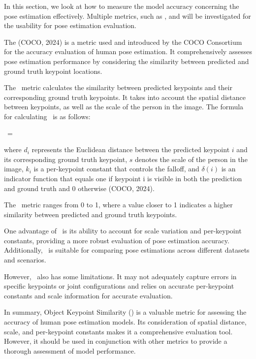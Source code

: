 In this section, we look at how to measure the model accuracy concerning the pose estimation effectively. Multiple metrics, such as {\bf \OKS}, {\bf \APE} and {\bf \MSE} will be investigated for the usability for pose estimation evaluation.

The {\bf \OKS} (\scc COCO, 2024) is a metric used and introduced by the COCO Consortium for the accuracy evaluation of human pose estimation. It comprehensively assesses pose estimation performance by considering the similarity between predicted and ground truth keypoint locations.

The \OKS\ metric calculates the similarity between predicted keypoints and their corresponding ground truth keypoints. It takes into account the spatial distance between keypoints, as well as the scale of the person in the image. The formula for calculating \OKS\ is as follows:

\startplaceformula[reference=oks]
 \startformula \OKS\ = 
 \stopformula
\stopplaceformula

where $ d_i $ represents the Euclidean distance between the predicted keypoint $ i $ and its corresponding ground truth keypoint, $ s $ denotes the scale of the person in the image, $ k_i $ is a per-keypoint constant that controls the falloff, and $ \delta(i) $ is an indicator function that equals one if keypoint i is visible in both the prediction and ground truth and 0 otherwise (\scc COCO, 2024).

The \OKS\ metric ranges from 0 to 1, where a value closer to 1 indicates a higher similarity between predicted and ground truth keypoints.

One advantage of \OKS\ is its ability to account for scale variation and per-keypoint constants, providing a more robust evaluation of pose estimation accuracy. Additionally, \OKS\ is suitable for comparing pose estimations across different datasets and scenarios.

However, \OKS\ also has some limitations. It may not adequately capture errors in specific keypoints or joint configurations and relies on accurate per-keypoint constants and scale information for accurate evaluation.

In summary, Object Keypoint Similarity (\OKS) is a valuable metric for assessing the accuracy of human pose estimation models. Its consideration of spatial distance, scale, and per-keypoint constants makes it a comprehensive evaluation tool. However, it should be used in conjunction with other metrics to provide a thorough assessment of model performance.

